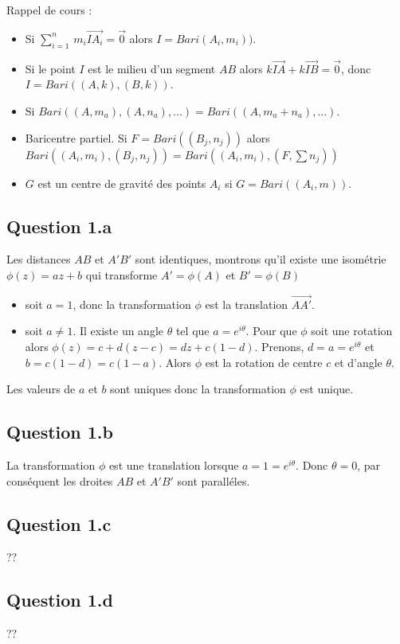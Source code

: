 \documentclass[]{book}
\theoremstyle{definition}
\begin{document}
Rappel de cours :
\begin{itemize}
\item Si $\sum_{i=1}^{n}\, m_i\overrightarrow{IA_i} = \overrightarrow{0}$ alors $I = Bari(A_i, m_i))$.
\item Si le point $I$ est le milieu d'un segment $AB$ alors $k\overrightarrow{IA}+k\overrightarrow{IB} = \overrightarrow{0}$, donc $I=Bari((A,k),(B,k))$.
\item Si $Bari((A,m_a), (A,n_a), ...) = Bari((A,m_a+n_a), ...)$.
\item Baricentre partiel. Si $F = Bari((B_j, n_j))$ alors $Bari((A_i,m_i),(B_j, n_j)) = Bari((A_i,m_i),(F,\sum n_j))$
\item $G$ est un centre de gravit\'e des points $A_i$ si $G=Bari((A_i, m))$.
\end{itemize}


\subsection*{Question 1.a}
Les distances $AB$ et $A'B'$ sont identiques, montrons qu'il existe une isom\'etrie $\phi(z) =  az+ b$ qui transforme $A' = \phi(A)$ et $B' = \phi(B)$ 
\begin{itemize}
\item soit $a=1$, donc la transformation $\phi$ est la translation $\overrightarrow{AA'}$.
\item soit $a \neq 1$. Il existe un angle $\theta$ tel que $a=e^{i\theta}$. Pour que $\phi$ soit une rotation alors $\phi(z) =  c + d(z - c) = dz +c(1-d)$. Prenons, $d = a = e^{i\theta}$ et $b=c(1-d)=c(1-a)$. Alors $\phi$ est la rotation de centre $c$ et d'angle $\theta$. 
\end{itemize}

Les valeurs de $a$ et $b$ sont uniques donc la transformation $\phi$ est unique.

\subsection*{Question 1.b}
La transformation $\phi$ est une translation lorsque $a=1=e^{i\theta}$. Donc $\theta = 0$, par cons\'equent les droites $AB$ et $A'B'$ sont parall\'eles. 

\subsection*{Question 1.c}
??


\subsection*{Question 1.d}
??
\end{document}
